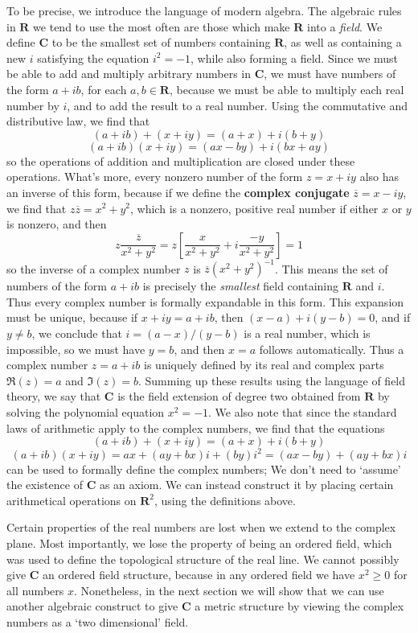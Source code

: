 To be precise, we introduce the language of modern algebra. The algebraic rules in $\mathbf{R}$ we tend to use the most often are those which make $\mathbf{R}$ into a {\it field}. We define $\mathbf{C}$ to be the smallest set of numbers containing $\mathbf{R}$, as well as containing a new $i$ satisfying the equation $i^2 = -1$, while also forming a field. Since we must be able to add and multiply arbitrary numbers in $\mathbf{C}$, we must have numbers of the form $a + ib$, for each $a,b \in \mathbf{R}$, because we must be able to multiply each real number by $i$, and to add the result to a real number. Using the commutative and distributive law, we find that
%
\[ (a + ib) + (x + iy) = (a + x) + i(b + y) \]
\[ (a + ib)(x + iy) = (ax - by) + i(bx + ay) \]
%
so the operations of addition and multiplication are closed under these operations. What's more, every nonzero number of the form $z = x + iy$ also has an inverse of this form, because if we define the {\bf complex conjugate} $\overline{z} = x - iy$, we find that $z\overline{z} = x^2 + y^2$, which is a nonzero, positive real number if either $x$ or $y$ is nonzero, and then
%
\[ z \frac{\overline{z}}{x^2 + y^2} = z \left[ \frac{x}{x^2 + y^2} + i \frac{-y}{x^2 + y^2} \right] = 1 \]
%
so the inverse of a complex number $z$ is $\overline{z}(x^2 + y^2)^{-1}$. This means the set of numbers of the form $a + ib$ is precisely the {\it smallest} field containing $\mathbf{R}$ and $i$. Thus every complex number is formally expandable in this form. This expansion must be unique, because if $x + iy = a + ib$, then $(x - a) + i(y-b) = 0$, and if $y \neq b$, we conclude that $i = (a-x)/(y-b)$ is a real number, which is impossible, so we must have $y = b$, and then $x = a$ follows automatically. Thus a complex number $z = a + ib$ is uniquely defined by its real and complex parts $\Re(z) = a$ and $\Im(z) = b$. Summing up these results using the language of field theory, we say that $\mathbf{C}$ is the field extension of degree two obtained from $\mathbf{R}$ by solving the polynomial equation $x^2 = -1$. We also note that since the standard laws of arithmetic apply to the complex numbers, we find that the equations
%
\[ (a + ib) + (x + iy) = (a + x) + i(b + y) \]
\[ (a + ib)(x + iy) = ax + (ay + bx)i + (by)i^2 = (ax - by) + (ay + bx)i \]
%
can be used to formally define the complex numbers; We don't need to `assume' the existence of $\mathbf{C}$ as an axiom. We can instead construct it by placing certain arithmetical operations on $\mathbf{R}^2$, using the definitions above.

Certain properties of the real numbers are lost when we extend to the complex plane. Most importantly, we lose the property of being an ordered field, which was used to define the topological structure of the real line. We cannot possibly give $\mathbf{C}$ an ordered field structure, because in any ordered field we have $x^2 \geq 0$ for all numbers $x$. Nonetheless, in the next section we will show that we can use another algebraic construct to give $\mathbf{C}$ a metric structure by viewing the complex numbers as a `two dimensional' field.

